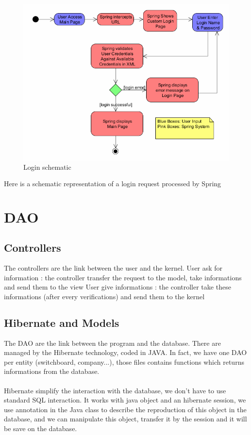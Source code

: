 \begin{figure}[H]
  \caption{Login schematic}
  \centering
    \includegraphics[width=1\textwidth]{img/login.png}
\end{figure}


Here is a schematic representation of a login request processed by Spring





\section{DAO}
\subsection{Controllers}

The controllers are the link between the user and the kernel.
User ask for information : the controller transfer the request to the model, take informations and send them to the view
User give informations : the controller take these informations (after every verifications) and send them to the kernel


\subsection{Hibernate and Models}

The DAO are the link between the program and the database. There are managed by the Hibernate technology, coded in JAVA.
In fact, we have one DAO per entity (switchboard, company...), those files contains functions which returns informations from the database.
\\
\\
Hibernate simplify the interaction with the database, we don't have to use standard SQL interaction.
It works with java object and an hibernate session, we use annotation in the Java class to describe the reproduction of this object in the database,
and we can manipulate this object, transfer it by the session and it will be save on the database.

